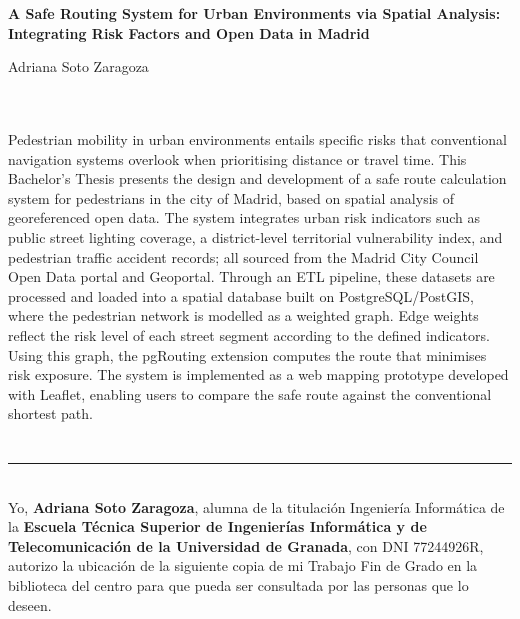 \thispagestyle{empty}

\begin{center}
{\large\bfseries A Safe Routing System for Urban Environments via Spatial Analysis: Integrating Risk Factors and Open Data in Madrid}\\
\end{center}
\begin{center}
Adriana Soto Zaragoza\\
\end{center}

\\

\vspace{0.7cm}
\\

Pedestrian mobility in urban environments entails specific risks that conventional navigation systems overlook when prioritising distance or travel time. This Bachelor's Thesis presents the design and development of a safe route calculation system for pedestrians in the city of Madrid, based on spatial analysis of georeferenced open data. The system integrates urban risk indicators such as public street lighting coverage, a district-level territorial vulnerability index, and pedestrian traffic accident records; all sourced from the Madrid City Council Open Data portal and Geoportal. Through an ETL pipeline, these datasets are processed and loaded into a spatial database built on PostgreSQL/PostGIS, where the pedestrian network is modelled as a weighted graph. Edge weights reflect the risk level of each street segment according to the defined indicators. Using this graph, the pgRouting extension computes the route that minimises risk exposure. The system is implemented as a web mapping prototype developed with Leaflet, enabling users to compare the safe route against the conventional shortest path.

\chapter*{}
\thispagestyle{empty}

\noindent\rule[-1ex]{\textwidth}{2pt}\\[4.5ex]

Yo, \textbf{Adriana Soto Zaragoza}, alumna de la titulación Ingeniería Informática de la \textbf{Escuela Técnica Superior
de Ingenierías Informática y de Telecomunicación de la Universidad de Granada}, con DNI 77244926R, autorizo la
ubicación de la siguiente copia de mi Trabajo Fin de Grado en la biblioteca del centro para que pueda ser
consultada por las personas que lo deseen.

